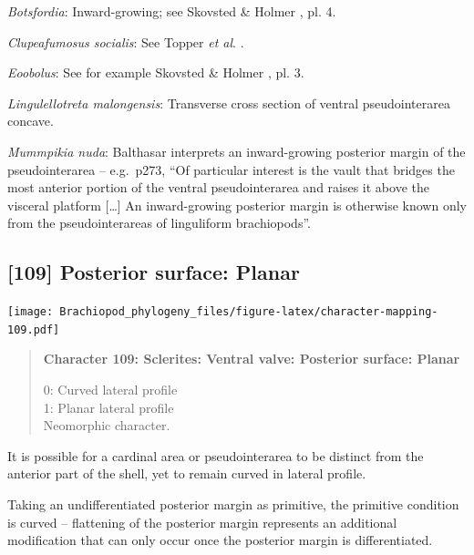 \documentclass[openany]{book}
\begin{document}
\hypertarget{Botsfordia-coding-108}{}
\emph{Botsfordia}: Inward-growing; see Skovsted \& Holmer
\citeyearpar{Skovsted2005EarlyCambrian}, pl. 4.

\hypertarget{Clupeafumosus_socialis-coding-108}{}
\emph{Clupeafumosus socialis}: See Topper \emph{et al}.
\citeyearpar{Topper2013Reappraisalof}.

\hypertarget{Eoobolus-coding-108}{}
\emph{Eoobolus}: See for example Skovsted \& Holmer
\citeyearpar{Skovsted2005EarlyCambrian}, pl. 3.

\hypertarget{Lingulellotreta_malongensis-coding-108}{}
\emph{Lingulellotreta malongensis}: Transverse cross section of ventral
pseudointerarea concave.

\hypertarget{Mummpikia_nuda-coding-108}{}
\emph{Mummpikia nuda}: Balthasar \citeyearpar{Balthasar2008iMummpikia}
interprets an inward-growing posterior margin of the pseudointerarea --
e.g.~p273, ``Of particular interest is the vault that bridges the most
anterior portion of the ventral pseudointerarea and raises it above the
visceral platform {[}\ldots{}{]} An inward-growing posterior margin is
otherwise known only from the pseudointerareas of linguliform
brachiopods''.

\subsection*{{[}109{]} Posterior surface:
Planar}\label{posterior-surface-planar}

\texttt{[image: Brachiopod\_phylogeny\_files/figure-latex/character-mapping-109.pdf]}

\begin{quote}
\textbf{Character 109: Sclerites: Ventral valve: Posterior surface:
Planar}

0: Curved lateral profile\\
1: Planar lateral profile\\
Neomorphic character.
\end{quote}

It is possible for a cardinal area or pseudointerarea to be distinct
from the anterior part of the shell, yet to remain curved in lateral
profile.

Taking an undifferentiated posterior margin as primitive, the primitive
condition is curved -- flattening of the posterior margin represents an
additional modification that can only occur once the posterior margin is
differentiated.
\end{document}
